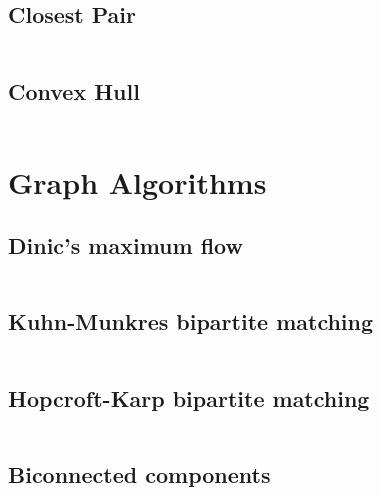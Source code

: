 \documentclass[a4paper]{article}
\begin{document}
  \subsection{Closest Pair}
  \inputminted{cpp}{src/our/close_pair.cpp}
  
  \subsection{Convex Hull}
  \inputminted{cpp}{src/our/convex_hull.cpp}
  
  \section{Graph Algorithms}

  
  \subsection{Dinic's maximum flow}
  \inputminted{cpp}{src/graph_dinic.cpp}



  \subsection{Kuhn-Munkres bipartite matching}
  \inputminted{cpp}{src/graph_KM.cpp}

  \subsection{Hopcroft-Karp bipartite matching}
  \inputminted{cpp}{src/graph_hopcroft_karp.cpp}

  \subsection{Biconnected components}
  \inputminted{cpp}{src/graph_bcc.cpp}
\end{document}

